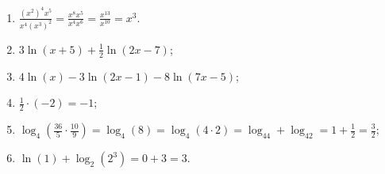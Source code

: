 \begin{enumerate}
	\item $\frac{(x^2)^4x^5}{x^4(x^3)^2}=\frac{x^8x^5}{x^4x^6}=\frac{x^{13}}{x^{10}}=x^3$.
	\item $3\ln(x+5)+\frac{1}{2}\ln(2x-7)$;
	\item $4\ln(x)-3\ln(2x-1)-8\ln(7x-5)$;
	\item $\frac{1}{2}\cdot(-2)=-1$;
	\item $\log_4\left(\frac{36}{5}\cdot\frac{10}{9}\right)=\log_4(8)=\log_4(4\cdot 2)=\log_44+\log_42=1+\frac{1}{2}=\frac{3}{2}$;
	\item $\ln(1)+\log_2(2^3)=0+3=3$.
\end{enumerate}
